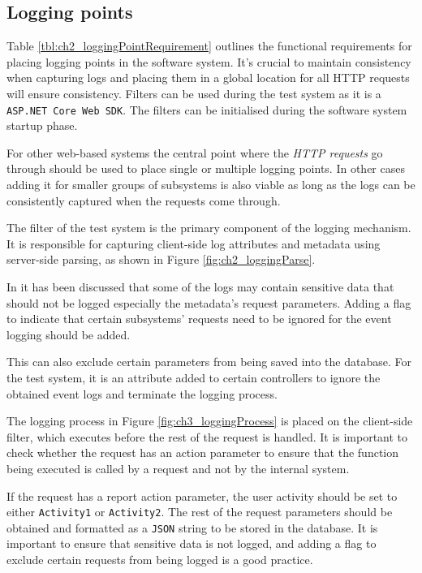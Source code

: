 \subsection{Logging points}
Table \ref{tbl:ch2_loggingPointRequirement} outlines the functional requirements for placing logging points in the software system. It's crucial to maintain consistency when capturing logs and placing them in a global location for all HTTP requests will ensure consistency. Filters can be used during the test system as it is a \texttt{ASP.NET Core Web SDK}. The filters can be initialised during the software system startup phase.\par For other web-based systems the central point where the \textit{HTTP requests} go through should be used to place single or multiple logging points. In other cases adding it for smaller groups of subsystems is also viable as long as the logs can be consistently captured when the requests come through. \par The filter of the test system is the primary component of the logging mechanism. It is responsible for capturing client-side log attributes and metadata using server-side parsing, as shown in Figure \ref{fig:ch2_loggingParse}. \par In  it has been discussed that some of the logs may contain sensitive data that should not be logged especially the metadata's request parameters. Adding a flag to indicate that certain subsystems' requests need to be ignored for the event logging should be added.\par This can also exclude certain parameters from being saved into the database. For the test system, it is an attribute added to certain controllers to ignore the obtained event logs and terminate the logging process.\par The logging process in Figure \ref{fig:ch3_loggingProcess} is placed on the client-side filter, which executes before the rest of the request is handled. It is important to check whether the request has an action parameter to ensure that the function being executed is called by a request and not by the internal system.\par If the request has a report action parameter, the user activity should be set to either \texttt{Activity1} or \texttt{Activity2}. The rest of the request parameters should be obtained and formatted as a \texttt{JSON} string to be stored in the database. It is important to ensure that sensitive data is not logged, and adding a flag to exclude certain requests from being logged is a good practice.

